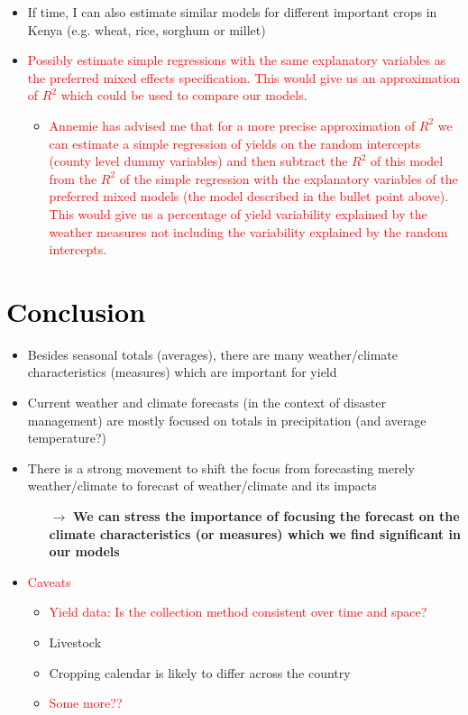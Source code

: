 \documentclass[a4paper,12pt]{article}
\begin{document}
\begin{itemize}
\item If time, I can also estimate similar models for different important crops in Kenya (e.g. wheat, rice, sorghum or millet)

\item \textcolor{red}{Possibly estimate simple regressions with the same explanatory variables as the preferred mixed effects specification. This would give us an approximation of $R^2$ which could be used to compare our models.}

		\begin{itemize}
			\item \textcolor{red}{Annemie has advised me that for a more precise approximation of $R^2$ we can estimate a simple regression of yields on the random intercepts (county level dummy variables) and then subtract the $R^2$ of this model from the $R^2$ of the simple regression with the explanatory variables of the preferred mixed models (the model described in the bullet point above). This would give us a percentage of yield variability explained by the weather measures not including the variability explained by the random intercepts.}
	\end{itemize}
		\end{itemize}
		
		
\section{\textcolor{black}{Conclusion}}\label{Conclusion}

	\begin{itemize}
	\item Besides seasonal totals (averages), there are many weather/climate characteristics (measures) which are important for yield
	\item  Current weather and climate forecasts (in the context of disaster management) are mostly focused on totals in precipitation (and average temperature?) 
	\item There is a strong movement to shift the focus from forecasting merely weather/climate to forecast of weather/climate and its impacts
	
	\begin{itemize}
	\item[$\boldsymbol{\rightarrow}$] \textbf{We can stress the importance of focusing the forecast on the climate characteristics (or measures) which we find significant in our models}
\end{itemize}

	\item \textcolor{red}{Caveats}
	
	\begin{itemize}
	\item\textcolor{red}{ Yield data: Is the collection method consistent over time and space?}
	\item Livestock
	\item Cropping calendar is likely to differ across the country 
	\item \textcolor{red}{Some more??}
	
	\end{itemize}
\end{itemize}
\color{black}
\end{document}
